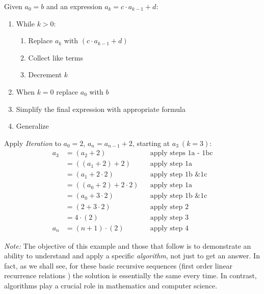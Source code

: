 \begin{exposition}\label{exp:iteration}
    Given \(a_0=b\) and an expression \(a_k=c\cdot a_{k-1}+d\):
    \begin{enumerate}
        \item While \(k>0\):
        \begin{enumerate}
            \item Replace \(a_k\) with \((c\cdot a_{k-1}+d)\)
            \item Collect like terms
            \item Decrement \(k\)
        \end{enumerate}
        \item When \(k=0\) replace \(a_0\) with \(b\)
        \item Simplify the final expression with appropriate formula
        \item Generalize
    \end{enumerate}

    Apply \emph{Iteration} to \(a_0=2\), \(a_n=a_{n-1}+2\), starting at \(a_3\ (k=3)\):
    \addtolength{\jot}{3pt}
    \begin{align*}
        a_3 &= (a_2+2) && \text{apply steps 1a - 1bc}\\
            &= ((a_1+2)+2) && \text{apply step 1a}\\
            &= (a_1+2\cdot 2) && \text{apply step 1b \& 1c}\\
            &= ((a_0+2)+2\cdot 2) && \text{apply step 1a}\\
            &= (a_0+3\cdot 2) && \text{apply step 1b \& 1c}\\
            &= (2+3\cdot 2) && \text{apply step 2}\\
            &= 4\cdot (2) && \text{apply step 3}\\
        a_n &= (n+1)\cdot(2) && \text{apply step 4}
    \end{align*}

    \emph{Note:} The objective of this example and those that follow is to demonstrate an ability to understand and apply a specific \emph{algorithm}, not just to get an answer.  In fact, as we shall see, for these basic recursive sequences (first order linear recurrence relations ) the solution is essentially the same every time.  In contrast, algorithms play a crucial role in mathematics and computer science. 
\end{exposition}

